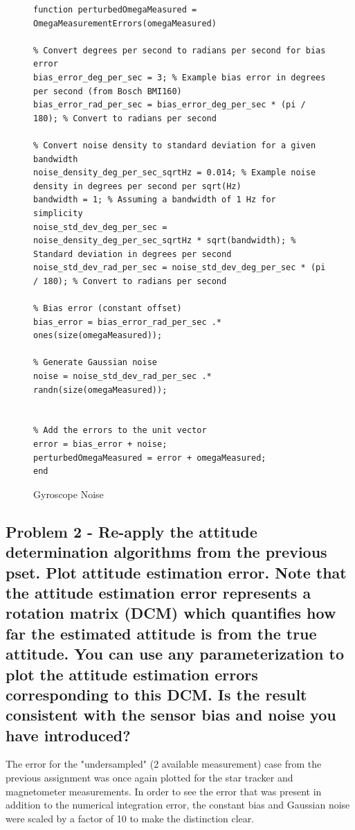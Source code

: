 \begin{figure} [H]
    \centering
    \begin{lstlisting}
function perturbedOmegaMeasured = OmegaMeasurementErrors(omegaMeasured)

% Convert degrees per second to radians per second for bias error
bias_error_deg_per_sec = 3; % Example bias error in degrees per second (from Bosch BMI160)
bias_error_rad_per_sec = bias_error_deg_per_sec * (pi / 180); % Convert to radians per second

% Convert noise density to standard deviation for a given bandwidth
noise_density_deg_per_sec_sqrtHz = 0.014; % Example noise density in degrees per second per sqrt(Hz)
bandwidth = 1; % Assuming a bandwidth of 1 Hz for simplicity
noise_std_dev_deg_per_sec = noise_density_deg_per_sec_sqrtHz * sqrt(bandwidth); % Standard deviation in degrees per second
noise_std_dev_rad_per_sec = noise_std_dev_deg_per_sec * (pi / 180); % Convert to radians per second

% Bias error (constant offset)
bias_error = bias_error_rad_per_sec .* ones(size(omegaMeasured));

% Generate Gaussian noise
noise = noise_std_dev_rad_per_sec .* randn(size(omegaMeasured));


% Add the errors to the unit vector
error = bias_error + noise;
perturbedOmegaMeasured = error + omegaMeasured;
end
    \end{lstlisting}
    \caption{Gyroscope Noise}
    \label{fig:gyroNoise}
\end{figure}

\subsection{Problem 2 - Re-apply the attitude determination algorithms from the previous pset. Plot attitude estimation error. Note that the attitude estimation error represents a rotation matrix (DCM) which quantifies how far the estimated
attitude is from the true attitude. You can use any parameterization to plot the attitude estimation errors corresponding to this DCM. Is the result consistent with the sensor bias and noise you have introduced?}

The error for the "undersampled" (2 available measurement) case from the previous assignment was once again plotted for the star tracker and magnetometer measurements. In order to see the error that was present in addition to the numerical integration error, the constant bias and Gaussian noise were scaled by a factor of 10 to make the distinction clear. 

